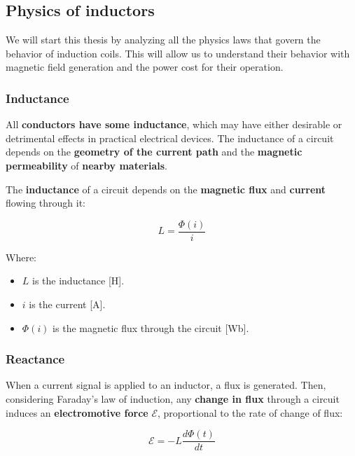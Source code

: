 \subsection{Physics of inductors}
We will start this thesis by analyzing all the physics laws that govern the behavior of induction coils. This will allow us to understand their behavior with magnetic field generation and the power cost for their operation. 
\subsubsection{Inductance}
All \textbf{conductors have some inductance}, which may have either desirable or detrimental effects in practical electrical devices. The inductance of a circuit depends on the \textbf{geometry of the current path} and the \textbf{magnetic permeability} of \textbf{nearby materials}.

\begin{samepage}
    The \textbf{inductance} of a circuit depends on the \textbf{magnetic flux} and \textbf{current} flowing through it:
    
    \nopagebreak

    \begin{equation}
        L = \frac{\Phi(i)}{i} \label{eq: Inductance_&_flux}
    \end{equation}

    \nopagebreak

    Where:
    \begin{itemize}
        \item $L$ is the inductance [H].
        \item $i$ is the current [A].
        \item $\Phi(i)$ is the magnetic flux through the circuit [Wb].
    \end{itemize}
\end{samepage}    

\subsubsection{Reactance}
When a current signal is applied to an inductor, a flux is generated.
Then, considering Faraday's law of induction, any \textbf{change in flux} through a circuit induces an \textbf{electromotive force} ${\mathcal {E}}$, proportional to the rate of change of flux:

\begin{equation}
    {\mathcal {E}} = -L \frac{d\Phi(t)}{dt}
\end{equation}

